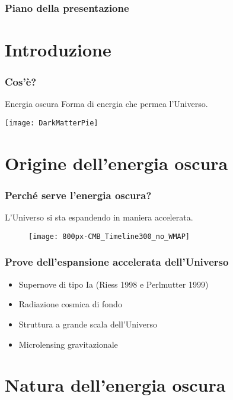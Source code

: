 \begin{frame}
  \maketitle
\end{frame}

\begin{frame}
  \frametitle{Piano della presentazione}
  \tableofcontents
\end{frame}

\section{Introduzione}

\begin{frame}
  \frametitle{Cos'è?}
  \begin{block}{Energia oscura}
    Forma di energia che permea l'Universo.
  \end{block}
  \texttt{[image: DarkMatterPie]}
\end{frame}

\section[Origine]{Origine dell'energia oscura}

\begin{frame}
  \frametitle{Perché serve l'energia oscura?}
  L'Universo si sta espandendo in maniera \alert{accelerata}.
  \begin{figure}
    \centering
    \texttt{[image: 800px-CMB\_Timeline300\_no\_WMAP]}
  \end{figure}
\end{frame}

\begin{frame}
  \frametitle{Prove dell'espansione accelerata dell'Universo}
  \begin{itemize}
  \item Supernove di tipo Ia (Riess 1998 e Perlmutter 1999)
  \item Radiazione cosmica di fondo
  \item Struttura a grande scala dell'Universo
  \item Microlensing gravitazionale
  \end{itemize}
\end{frame}

\section[Natura]{Natura dell'energia oscura}

